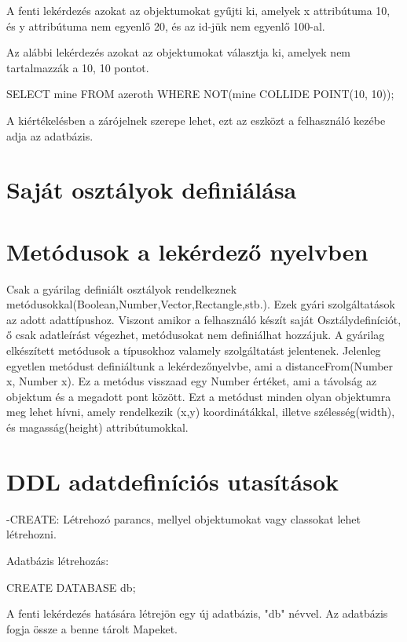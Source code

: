 A fenti lekérdezés azokat az objektumokat gyűjti ki, amelyek x attribútuma 10, és y attribútuma nem egyenlő 20, és az id-jük nem egyenlő 100-al.
\begin{sql}


Az alábbi lekérdezés azokat az objektumokat választja ki, amelyek nem tartalmazzák a 10, 10 pontot.
\begin{sql}
SELECT mine FROM azeroth WHERE NOT(mine COLLIDE POINT(10, 10));
\end{sql}


A kiértékelésben a zárójelnek szerepe lehet, ezt az eszközt a felhasználó kezébe adja az adatbázis.

\section{Saját osztályok definiálása}

\section{Metódusok a lekérdező nyelvben}

Csak a gyárilag definiált osztályok rendelkeznek metódusokkal(Boolean,Number,Vector,Rectangle,stb.).
Ezek gyári szolgáltatások az adott adattípushoz. Viszont amikor a felhasználó készít saját Osztálydefiníciót, ő csak adatleírást végezhet, metódusokat nem definiálhat hozzájuk. A gyárilag elkészített metódusok a típusokhoz valamely szolgáltatást jelentenek. Jelenleg egyetlen metódust definiáltunk a lekérdezőnyelvbe, ami a distanceFrom(Number x, Number x). Ez a metódus visszaad egy Number értéket, ami a távolság az objektum és a megadott pont között. Ezt a metódust minden olyan objektumra meg lehet hívni, amely rendelkezik (x,y) koordinátákkal, illetve szélesség(width), és magasság(height) attribútumokkal.

\section{DDL adatdefiníciós utasítások}

-CREATE: Létrehozó parancs, mellyel objektumokat vagy classokat lehet létrehozni.

Adatbázis létrehozás:
\begin{sql}
CREATE DATABASE db;
\end{sql}

A fenti lekérdezés hatására létrejön egy új adatbázis, "db" névvel. Az adatbázis fogja össze a benne tárolt Mapeket. 


\end{sql}

